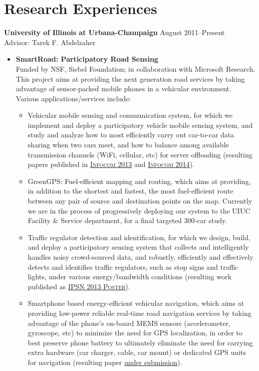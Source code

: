 \section{\sc Research Experiences} {\bf University of Illinois at Urbana-Champaign} \hfill August 2011--Present\\
Advisor: Tarek F. Abdelzaher 
\begin{itemize}
	\item \textbf{SmartRoad: Participatory Road Sensing} \\
	Funded by NSF, Siebel Foundation; in collaboration with Microsoft Research. This project aims at providing the next generation road services by taking advantage of sensor-packed mobile phones in a vehicular environment. Various applications/services include: 
	\begin{itemize}
		\item Vehicular mobile sensing and communication system, for which we implement and deploy a participatory vehicle mobile sensing system, and study and analyze how to most efficiently carry out car-to-car data sharing when two cars meet, and how to balance among available transmission channels (WiFi, cellular, etc) for server offloading (resulting papers published in \hyperlink{liu2013infocom}{\textsc{Infocom 2013}} and \hyperlink{hu2014infocom}{\textsc{Infocom 2014}}).
		
		\item GreenGPS: Fuel-efficient mapping and routing, which aims at providing, in addition to the shortest and fastest, the most fuel-efficient route between any pair of source and destination points on the map. Currently we are in the process of progressively deploying our system to the UIUC Facility \& Service department, for a final targeted 300-car study.
		
		\item Traffic regulator detection and identification, for which we design, build, and deploy a participatory sensing system that collects and intelligently handles noisy crowd-sourced data, and robustly, efficiently and effectively detects and identifies traffic regulators, such as stop signs and traffic lights, under various energy/bandwidth conditions (resulting work published as \hyperlink{hu2013ipsn}{\textsc{IPSN 2013 Poster}}).
		
		\item Smartphone based energy-efficient vehicular navigation, which aims at providing low-power reliable real-time road navigation services by taking advantage of the phone's on-board MEMS sensors (accelerometer, gyroscope, etc) to minimize the need for GPS localization, in order to best preserve phone battery to ultimately eliminate the need for carrying extra hardware (car charger, cable, car mount) or dedicated GPS units for navigation (resulting paper \hyperlink{}{under submission}). 
	\end{itemize}
	

\end{itemize}
